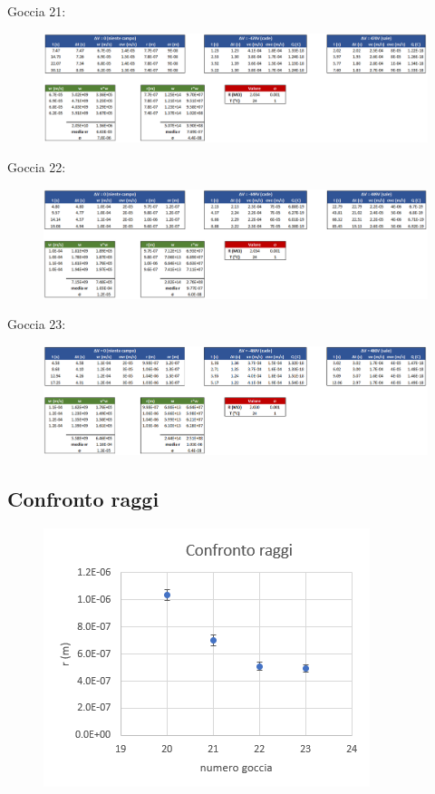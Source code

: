 \documentclass{article}
\begin{document}
Goccia 21:

\begin{figure}[h]
\centering
\includegraphics[width=\linewidth]{Goccia21}
\end{figure}

\vspace{10mm}

Goccia 22:

\begin{figure}[h]
\centering
\includegraphics[width=\linewidth]{Goccia22}
\end{figure}

\vspace{10mm}

Goccia 23:

\begin{figure}[h]
\centering
\includegraphics[width=\linewidth]{Goccia23}
\end{figure}

\pagebreak

\subsection{Confronto raggi}

\begin{figure}[h]
\centering
\includegraphics[width=0.5\linewidth]{Confronto_r_3}
\end{figure}
\end{document}

